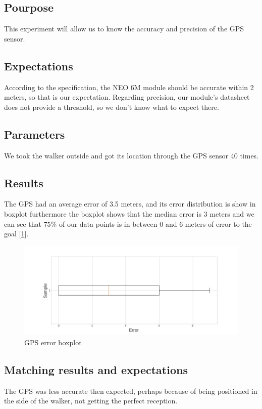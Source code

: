	\subsection{Pourpose}
		This experiment will allow us to know the accuracy and precision of the GPS sensor.
	\subsection{Expectations}
		According to the specification, the NEO 6M module should be accurate within 2 meters, so that is our expectation. Regarding precision, our module's datasheet does not provide a threshold, so we don't know what to expect there.

	\subsection{Parameters}
		We took the walker outside and got its location through the GPS sensor 40 times.

	\subsection{Results}
		The GPS had an average error of 3.5 meters, and its error distribution is show in boxplot furthermore the boxplot shows that the median error is 3 meters and  we can see that 75\% of our data points is in between 0 and 6 meters of error to the goal [\ref{fig:gps_plot}].

		\begin{figure}[h!]
			\centering
			\includegraphics[width=1.1\linewidth]{gfx/gps_boxplot_error}
			\caption{GPS error boxplot}
			\label{fig:gps_plot}
		\end{figure}

	\subsection{Matching results and expectations}
		The GPS was less accurate then expected, perhaps because of being positioned in the side of the walker, not getting the perfect reception.

